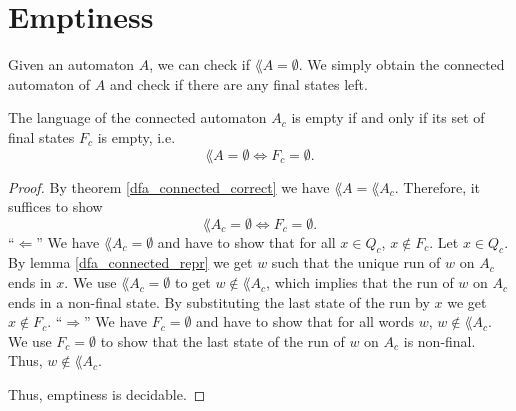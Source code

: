 

\section{Emptiness}

Given an automaton $A$, we can check if $\lang{A} = \emptyset$. We simply obtain the connected automaton of $A$ and check if there are any final states left. 

\begin{theorem}
    \label{dfa_lang_empty}
    The language of the connected automaton $A_c$ is empty if and only if its set of final states $F_c$ is empty, i.e.
    \begin{equation*}
        \lang{A} = \emptyset \iff F_c = \emptyset.
    \end{equation*}
\end{theorem}

\begin{proof}
    By theorem \ref{dfa_connected_correct} we have $\lang{A} = \lang{A_c}$.
    Therefore, it suffices to show
    \begin{equation*}
        \lang{A_c} = \emptyset \iff F_c = \emptyset.
    \end{equation*}
    ``$\Leftarrow$''
    We have $\lang{A_c} = \emptyset$ and have to show that for all $x \in Q_c$, $x \notin F_c$.
    Let $x \in Q_c$. 
    By lemma \ref{dfa_connected_repr} we get $w$ such that the unique run of $w$ on $A_c$
    ends in $x$. 
    We use $\lang{A_c} = \emptyset$ to get $w \notin \lang{A_c}$, 
    which implies that the run of $w$ on $A_c$ ends in a non-final state.
    By substituting the last state of the run by $x$ we get $x \notin F_c$.
    ``$\Rightarrow$''
    We have $F_c = \emptyset$ and have to show that for all words $w$, $w \notin \lang{A_c}$.
    We use $F_c = \emptyset$ to show that the last state of the run of $w$ on $A_c$ is non-final.
    Thus, $w \notin \lang{A_c}$.

    Thus, emptiness is decidable.
\end{proof}







